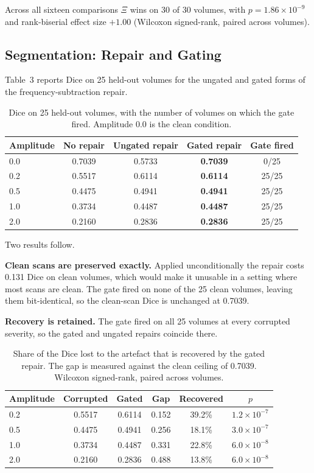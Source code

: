 \documentclass[12pt]{article}
\theoremstyle{definition}
\theoremstyle{plain}
\begin{document}
Across all sixteen comparisons $\Xi$ wins on 30 of 30 volumes, with
$p = 1.86\times10^{-9}$ and rank-biserial effect size $+1.00$ (Wilcoxon signed-rank,
paired across volumes).

\subsection{Segmentation: Repair and Gating}

Table~3 reports Dice on 25 held-out volumes for the ungated and gated forms of the
frequency-subtraction repair.

\begin{table}[H]
\centering
\caption{Dice on 25 held-out volumes, with the number of volumes on which the gate
fired. Amplitude 0.0 is the clean condition.}
\begin{tabular}{lcccc}
\toprule
Amplitude & No repair & Ungated repair & Gated repair & Gate fired \\
\midrule
0.0 & 0.7039 & 0.5733 & \textbf{0.7039} & 0/25 \\
0.2 & 0.5517 & 0.6114 & \textbf{0.6114} & 25/25 \\
0.5 & 0.4475 & 0.4941 & \textbf{0.4941} & 25/25 \\
1.0 & 0.3734 & 0.4487 & \textbf{0.4487} & 25/25 \\
2.0 & 0.2160 & 0.2836 & \textbf{0.2836} & 25/25 \\
\bottomrule
\end{tabular}
\end{table}

Two results follow.

\textbf{Clean scans are preserved exactly.} Applied unconditionally the repair costs
0.131 Dice on clean volumes, which would make it unusable in a setting where most
scans are clean. The gate fired on none of the 25 clean volumes, leaving them
bit-identical, so the clean-scan Dice is unchanged at 0.7039.

\textbf{Recovery is retained.} The gate fired on all 25 volumes at every corrupted
severity, so the gated and ungated repairs coincide there.

\begin{table}[H]
\centering
\caption{Share of the Dice lost to the artefact that is recovered by the gated
repair. The gap is measured against the clean ceiling of 0.7039. Wilcoxon
signed-rank, paired across volumes.}
\begin{tabular}{lccccc}
\toprule
Amplitude & Corrupted & Gated & Gap & Recovered & $p$ \\
\midrule
0.2 & 0.5517 & 0.6114 & 0.152 & 39.2\% & $1.2\times10^{-7}$ \\
0.5 & 0.4475 & 0.4941 & 0.256 & 18.1\% & $3.0\times10^{-7}$ \\
1.0 & 0.3734 & 0.4487 & 0.331 & 22.8\% & $6.0\times10^{-8}$ \\
2.0 & 0.2160 & 0.2836 & 0.488 & 13.8\% & $6.0\times10^{-8}$ \\
\bottomrule
\end{tabular}
\end{table}
\end{document}
